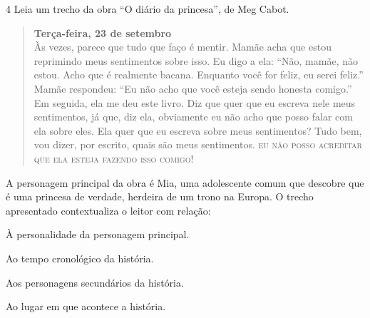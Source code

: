\num{4} Leia um trecho da obra ``O diário da princesa'', de Meg Cabot.

\begin{quote}
\centering\noindent\textbf{Terça-feira, 23 de setembro}\\

\noindent Às vezes, parece que tudo que faço é mentir.
Mamãe acha que estou reprimindo meus sentimentos sobre isso.
Eu digo a ela: ``Não, mamãe, não estou. Acho que é realmente bacana.
Enquanto você for feliz, eu serei feliz.''
Mamãe respondeu: ``Eu não acho que você esteja sendo honesta comigo.''
Em seguida, ela me deu este livro. Diz que quer que eu escreva nele meus
sentimentos, já que, diz ela, obviamente eu não acho que posso falar com ela sobre eles.
Ela quer que eu escreva sobre meus sentimentos?
Tudo bem, vou dizer, por escrito, quais são meus sentimentos.
\textsc{eu não posso acreditar que ela esteja fazendo isso comigo!}

\end{quote}

\noindent A personagem principal da obra é Mia, uma adolescente comum que descobre
que é uma princesa de verdade, herdeira de um trono na Europa. O trecho
apresentado contextualiza o leitor com relação:

\begin{escolha}
\item À personalidade da personagem principal.
\item Ao tempo cronológico da história.
\item Aos personagens secundários da história.
\item Ao lugar em que acontece a história.
\end{escolha}



